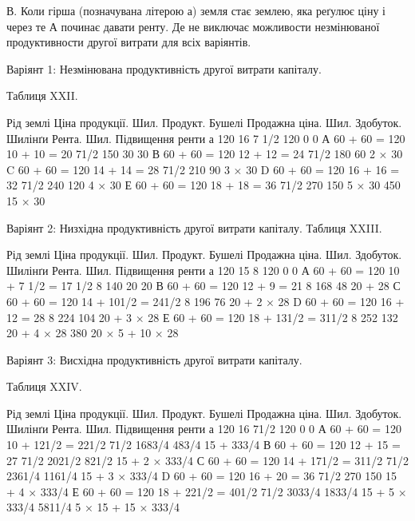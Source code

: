 В. Коли гірша (позначувана літерою а) земля стає землею, яка реґулює
ціну і через те А починає давати ренту. Де не виключає можливости незмінюваної
продуктивности другої витрати для всіх варіянтів.

Варіянт 1: Незмінювана продуктивність другої витрати капіталу.

Таблиця XXII.

Рід  землі
Ціна продукції. Шил.
Продукт. Бушелі
Продажна  ціна. Шил.
Здобуток. Шилінґи
Рента. Шил.
Підвищення ренти
а    120                                               16    7 1/2    120          0    0
А    60 + 60 = 120    10 + 10 = 20    71/2    150         30    30
В    60 + 60 = 120      12 + 12 = 24    71/2    180         60    2 × 30
C    60 + 60 = 120    14 + 14 = 28    71/2    210         90    3 × 30
D    60 + 60 = 120    16 + 16 = 32    71/2    240        120    4 × 30
Е    60 + 60 = 120    18 + 18 = 36    71/2    270        150    5 × 30
                    450    15 × 30

Варіянт 2: Низхідна продуктивність другої витрати капіталу.
  Таблиця XXIII.

Рід  землі
Ціна продукції. Шил.
Продукт. Бушелі
Продажна  ціна. Шил.
Здобуток. Шилінґи
Рента. Шил.
Підвищення ренти
а                       120                        15            8    120            0    0
А 60 + 60 = 120 10 + 7 1/2 = 17 1/2 8 140 20 20
В 60 + 60 = 120 12 + 9 = 21 8 168 48 20 + 28
С 60 + 60 = 120 14 + 101/2 = 241/2    8    196            76    20 + 2 × 28
D 60 + 60 = 120 16 + 12 = 28 8 224 104 20 + 3 × 28
Е 60 + 60 = 120 18 + 131/2 = 311/2    8    252            132    20 + 4 × 28
                    380    20 × 5 + 10 × 28

Варіянт 3: Висхідна продуктивність другої витрати капіталу.

 Таблиця XXIV.

Рід  землі
Ціна продукції. Шил.
Продукт. Бушелі
Продажна  ціна. Шил.
Здобуток. Шилінґи
Рента. Шил.
Підвищення ренти
а                       120                           16              71/2    120            0      
          0
А    60 + 60 = 120    10 + 121/2 = 221/2     71/2    1683/4    483/4    15 + 333/4
В    60 + 60 = 120    12 + 15 = 27                      71/2    2021/2    821/2    15 + 2 × 333/4
С    60 + 60 = 120    14 + 171/2 = 311/2      71/2    2361/4    1161/4    15 + 3 × 333/4
D    60 + 60 = 120    16 + 20 = 36                      71/2    270            150            15 + 4
× 333/4
Е    60 + 60 = 120    18 + 221/2 = 401/2      71/2    3033/4    1833/4    15 + 5 × 333/4
                    5811/4    5 × 15 + 15 × 333/4
\parbreak{}  %
